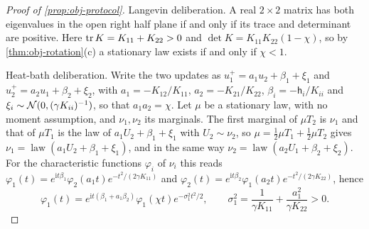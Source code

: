 \begin{proof}[Proof of \cref{prop:obj-protocol}]
Langevin deliberation. A real $2\times2$ matrix has both eigenvalues in the open right half plane if and only if its trace and determinant are positive. Here $\operatorname{tr} K=K_{11}+K_{22}>0$ and $\det K=K_{11}K_{22}(1-\chi)$, so by \cref{thm:obj-rotation}(c) a stationary law exists if and only if $\chi<1$.

Heat-bath deliberation. Write the two updates as $u_1^+=a_1u_2+\beta_1+\xi_1$ and $u_2^+=a_2u_1+\beta_2+\xi_2$, with $a_1=-K_{12}/K_{11}$, $a_2=-K_{21}/K_{22}$, $\beta_i=-\mathsf h_i/K_{ii}$ and $\xi_i\sim\mathcal{N}(0,(\gamma K_{ii})^{-1})$, so that $a_1a_2=\chi$. Let $\mu$ be a stationary law, with no moment assumption, and $\nu_1,\nu_2$ its marginals. The first marginal of $\mu T_2$ is $\nu_1$ and that of $\mu T_1$ is the law of $a_1U_2+\beta_1+\xi_1$ with $U_2\sim\nu_2$, so $\mu=\frac12\mu T_1+\frac12\mu T_2$ gives $\nu_1=\operatorname{law}(a_1U_2+\beta_1+\xi_1)$, and in the same way $\nu_2=\operatorname{law}(a_2U_1+\beta_2+\xi_2)$. For the characteristic functions $\varphi_i$ of $\nu_i$ this reads $\varphi_1(t)=e^{\mathrm it\beta_1}\varphi_2(a_1t)e^{-t^2/(2\gamma K_{11})}$ and $\varphi_2(t)=e^{\mathrm it\beta_2}\varphi_1(a_2t)e^{-t^2/(2\gamma K_{22})}$, hence
\begin{equation}\label{eq:obj-charfn}
\varphi_1(t)=e^{\mathrm it(\beta_1+a_1\beta_2)}\varphi_1(\chi t)e^{-\sigma_1^2t^2/2},\qquad\sigma_1^2=\frac1{\gamma K_{11}}+\frac{a_1^2}{\gamma K_{22}}>0.
\end{equation}

\end{proof}
